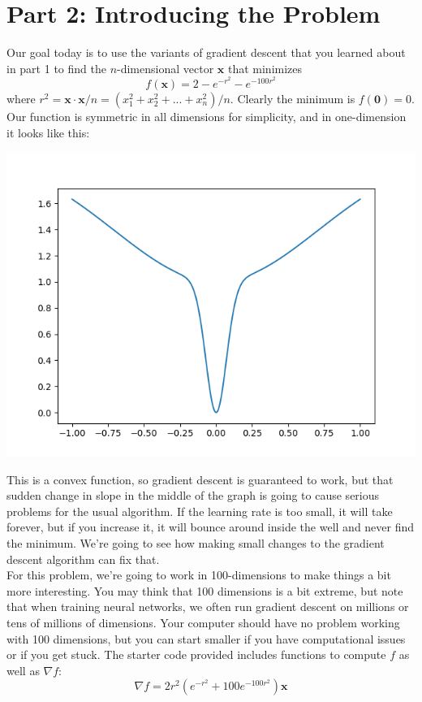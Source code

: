 \documentclass[12pt]{article}
\begin{document}
\section*{Part 2: Introducing the Problem}
Our goal today is to use the variants of gradient descent that you learned about in part 1 to find the $n$-dimensional vector $\mathbf{x}$ that minimizes
$$
	f(\mathbf{x}) = 2 - e^{-r^2} - e^{-100r^2}
$$
where $r^2 = \mathbf{x}\cdot\mathbf{x} / n = (x_1^2 + x_2^2 + ... + x_n^2) / n$.  Clearly the minimum is $f(\mathbf{0}) = 0$.  Our function is symmetric in all dimensions for simplicity, and in one-dimension it looks like this:
\begin{center}
\includegraphics[width=0.75\linewidth]{fx}
\end{center}
This is a convex function, so gradient descent is guaranteed to work, but that sudden change in slope in the middle of the graph is going to cause serious problems for the usual algorithm.  If the learning rate is too small, it will take forever, but if you increase it, it will bounce around inside the well and never find the minimum.  We're going to see how making small changes to the gradient descent algorithm can fix that.\\

\noindent For this problem, we're going to work in 100-dimensions to make things a bit more interesting.  You may think that 100 dimensions is a bit extreme, but note that when training neural networks, we often run gradient descent on millions or tens of millions of dimensions.  Your computer should have no problem working with 100 dimensions, but you can start smaller if you have computational issues or if you get stuck.  The starter code provided includes functions to compute $f$ as well as $\nabla f$:
$$
	\nabla f = 2r^2 \left(e^{-r^2} + 100e^{-100r^2}\right)\mathbf{x}
$$
\end{document}
